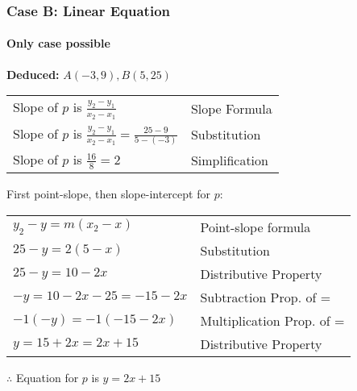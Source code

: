 \documentclass[mathserif]{beamer}
\begin{document}
\begin{frame}
	\frametitle{Case B: Linear Equation}
	\framesubtitle{Only case possible}
	
	\textbf{Deduced:} $A(-3,9),B(5,25)$
	
	\begin{center}
		\begin{tabular}{l | l}
			Slope of $p$ is $\frac{y_2-y_1}{x_2-x_1}$ & Slope Formula \\
			Slope of $p$ is $\frac{y_2-y_1}{x_2-x_1}=\frac{25-9}{5-(-3)}$ & Substitution \\
			Slope of $p$ is $\frac{16}{8}=2$ & Simplification \\
		\end{tabular}
	\end{center}
	
	First point-slope, then slope-intercept for $p$: 
	
	\begin{center}
		\begin{tabular}{l | l}
			$y_2-y=m(x_2-x)$ & Point-slope formula \\
			$25-y=2(5-x)$ & Substitution \\
			$25-y=10-2x$ & Distributive Property \\
			$-y=10-2x-25=-15-2x$ & Subtraction Prop. of = \\
			$-1(-y)=-1(-15-2x)$ & Multiplication Prop. of = \\
			$y=15+2x=2x+15$ & Distributive Property
		\end{tabular}
	\end{center}

	$\therefore$ Equation for $p$ is $\boxed{y=2x+15}$
\end{frame}
\end{document}
